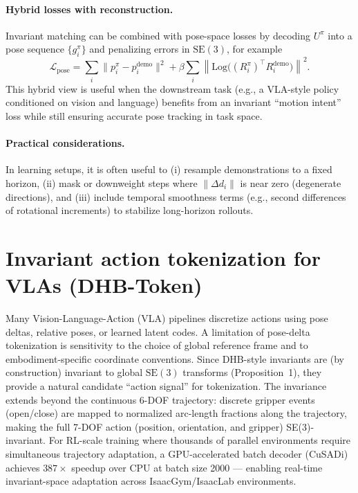 \documentclass[11pt]{article}
\begin{document}
\paragraph{Hybrid losses with reconstruction.}
Invariant matching can be combined with pose-space losses by decoding $U^{\pi}$ into a pose sequence $\{g_i^{\pi}\}$ and penalizing errors in $\mathrm{SE}(3)$, for example
\begin{equation}
  \mathcal{L}_{\mathrm{pose}} = \sum_i \lVert p_i^{\pi} - p_i^{\mathrm{demo}}\rVert^2 + \beta \sum_i \left\lVert \mathrm{Log}\bigl( (R_i^{\pi})^\top R_i^{\mathrm{demo}}\bigr) \right\rVert^2.
\end{equation}
This hybrid view is useful when the downstream task (e.g., a VLA-style policy conditioned on vision and language) benefits from an invariant ``motion intent'' loss while still ensuring accurate pose tracking in task space.

\paragraph{Practical considerations.}
In learning setups, it is often useful to (i) resample demonstrations to a fixed horizon, (ii) mask or downweight steps where $\lVert \Delta d_i\rVert$ is near zero (degenerate directions), and (iii) include temporal smoothness terms (e.g., second differences of rotational increments) to stabilize long-horizon rollouts.

\section{Invariant action tokenization for VLAs (DHB-Token)}
Many Vision-Language-Action (VLA) pipelines discretize actions using pose deltas, relative poses, or learned latent codes. A limitation of pose-delta tokenization is sensitivity to the choice of global reference frame and to embodiment-specific coordinate conventions. Since DHB-style invariants are (by construction) invariant to global $\mathrm{SE}(3)$ transforms (Proposition~1), they provide a natural candidate ``action signal'' for tokenization.
The invariance extends beyond the continuous 6-DOF trajectory: discrete gripper events (open/close) are mapped to normalized arc-length fractions along the trajectory, making the full 7-DOF action (position, orientation, and gripper) SE(3)-invariant.
For RL-scale training where thousands of parallel environments require simultaneous trajectory adaptation, a GPU-accelerated batch decoder (CuSADi) achieves $387\times$ speedup over CPU at batch size 2000 --- enabling real-time invariant-space adaptation across IsaacGym/IsaacLab environments.
\end{document}
